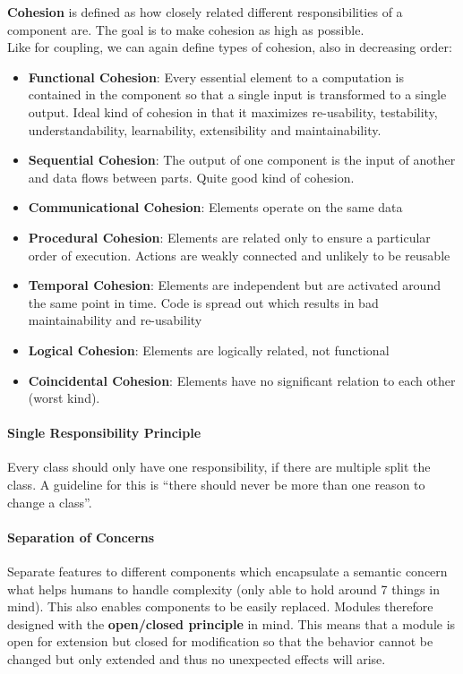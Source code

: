 \textbf{Cohesion} is defined as how closely related different responsibilities of a component are. The goal is to make cohesion as high as possible.\\
Like for coupling, we can again define types of cohesion, also in decreasing order:
\begin{itemize}
  \item \textbf{Functional Cohesion}: Every essential element to a computation is contained in the component so that a single input is transformed to a single output. Ideal kind of cohesion in that it maximizes re-usability, testability, understandability, learnability, extensibility and maintainability.
  \item \textbf{Sequential Cohesion}: The output of one component is the input of another and data flows between parts. Quite good kind of cohesion.
  \item \textbf{Communicational Cohesion}: Elements operate on the same data
  \item \textbf{Procedural Cohesion}: Elements are related only to ensure a particular order of execution. Actions are weakly connected and unlikely to be reusable
  \item \textbf{Temporal Cohesion}: Elements are independent but are activated around the same point in time. Code is spread out which results in bad maintainability and re-usability
  \item \textbf{Logical Cohesion}: Elements are logically related, not functional
  \item \textbf{Coincidental Cohesion}: Elements have no significant relation to each other (worst kind).
\end{itemize}

\paragraph{Single Responsibility Principle}
Every class should only have one responsibility, if there are multiple split the class.
A guideline for this is ``there should never be more than one reason to change a class''.

\paragraph{Separation of Concerns}
Separate features to different components which encapsulate a semantic concern what helps humans to handle complexity (only able to hold around 7 things in mind).
This also enables components to be easily replaced.
Modules therefore designed with the \textbf{open/closed principle} in mind.
This means that a module is open for extension but closed for modification so that the behavior cannot be changed but only extended and thus no unexpected effects will arise.

